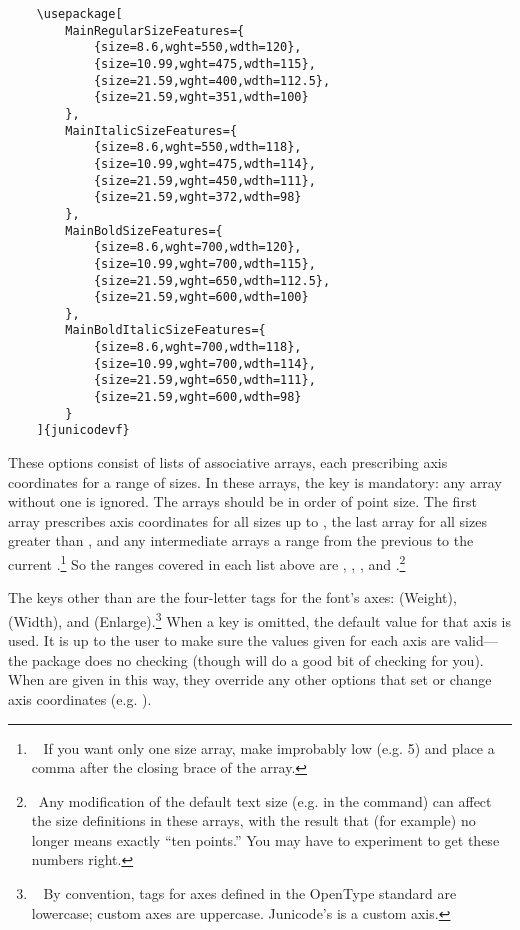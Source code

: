 \footnotesize
\begin{verbatim}
    \usepackage[
        MainRegularSizeFeatures={
            {size=8.6,wght=550,wdth=120},
            {size=10.99,wght=475,wdth=115},
            {size=21.59,wght=400,wdth=112.5},
            {size=21.59,wght=351,wdth=100}
        },
        MainItalicSizeFeatures={
            {size=8.6,wght=550,wdth=118},
            {size=10.99,wght=475,wdth=114},
            {size=21.59,wght=450,wdth=111},
            {size=21.59,wght=372,wdth=98}
        },
        MainBoldSizeFeatures={
            {size=8.6,wght=700,wdth=120},
            {size=10.99,wght=700,wdth=115},
            {size=21.59,wght=650,wdth=112.5},
            {size=21.59,wght=600,wdth=100}
        },
        MainBoldItalicSizeFeatures={
            {size=8.6,wght=700,wdth=118},
            {size=10.99,wght=700,wdth=114},
            {size=21.59,wght=650,wdth=111},
            {size=21.59,wght=600,wdth=98}
        }
    ]{junicodevf}
\end{verbatim}
\normalsize

\noindent These options consist of lists of associative arrays, each
prescribing axis coordinates for a range of sizes. In these arrays,
the  key is mandatory: any array without one is ignored. The
arrays should be in order of point size. The first array
prescribes axis coordinates for all sizes up to , the last array for all sizes
greater than , and any intermediate arrays a range from the previous to the
current .\footnote{\ %
If you want only one size array, make  improbably low (e.g. 5) and place
a comma after the closing brace of the array.%
} So the ranges covered in each list above are , ,
,
and .\footnote{\ Any modification of the default text size (e.g. in the
 command) can affect the size definitions in these
arrays, with the result that (for example)
 no longer means exactly “ten points.” You may have to experiment to get these numbers
right.}

The keys other than  are the four-letter tags for the font's axes: 
(Weight),  (Width), and  (Enlarge).\footnote{\ %
By convention, tags for axes defined in the OpenType standard are lowercase; custom axes
are uppercase. Junicode’s  is a custom axis.%
} When a key
is omitted, the default value for that axis is used. It is up to the user to make sure the values
given for each axis are valid---the package does no checking (though {\fspec} will do a good bit
of checking for you). When  are given in
this way, they override any other options that set or change axis coordinates
(e.g. ).

